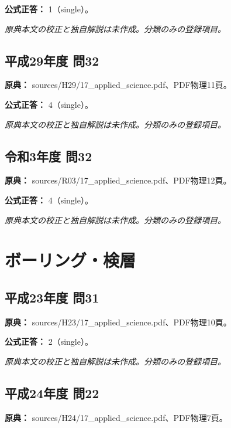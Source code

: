 \textbf{公式正答：} 1（single）。

\par\textit{原典本文の校正と独自解説は未作成。分類のみの登録項目。}

\subsection{平成29年度 問32}
\label{q:h29-reg-applied-32}

\noindent\textbf{原典：} sources/H29/17\_applied\_science.pdf、PDF物理11頁。

\textbf{公式正答：} 4（single）。

\par\textit{原典本文の校正と独自解説は未作成。分類のみの登録項目。}

\subsection{令和3年度 問32}
\label{q:r03-reg-applied-32}

\noindent\textbf{原典：} sources/R03/17\_applied\_science.pdf、PDF物理12頁。

\textbf{公式正答：} 4（single）。

\par\textit{原典本文の校正と独自解説は未作成。分類のみの登録項目。}

\section{ボーリング・検層}

\subsection{平成23年度 問31}
\label{q:h23-reg-applied-31}

\noindent\textbf{原典：} sources/H23/17\_applied\_science.pdf、PDF物理10頁。

\textbf{公式正答：} 2（single）。

\par\textit{原典本文の校正と独自解説は未作成。分類のみの登録項目。}

\subsection{平成24年度 問22}
\label{q:h24-reg-applied-22}

\noindent\textbf{原典：} sources/H24/17\_applied\_science.pdf、PDF物理7頁。


